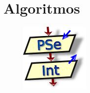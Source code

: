 \chapter{Algoritmos}

\lipsum[1]
\begin{figure}
	\includegraphics[width=0.19\paperwidth]{./img/pseint}
\end{figure}
\lipsum[1]
